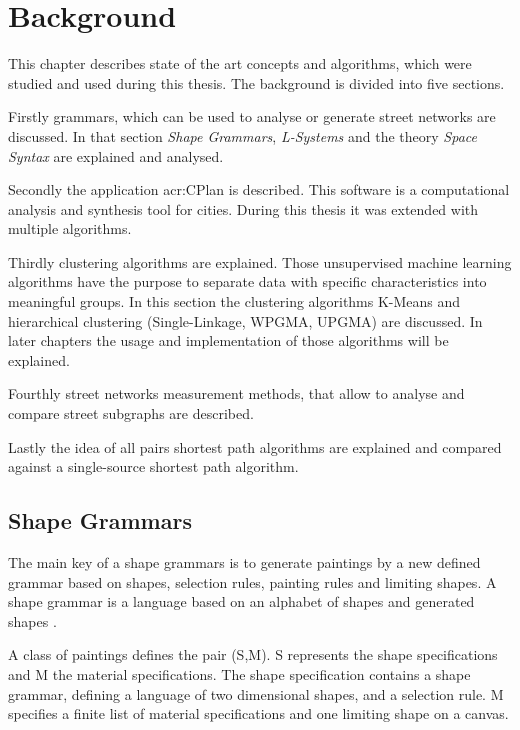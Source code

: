\chapter{Background}
This chapter describes state of the art concepts and algorithms, which were studied and used during this thesis. The background is divided into five sections.

Firstly grammars, which can be used to analyse or generate street networks are discussed. In that section \textit{Shape Grammars}, \textit{L-Systems} and the theory \textit{Space Syntax} are explained and analysed.

Secondly the application \gls{acr:CPlan} is described. This software is a computational analysis and synthesis tool for cities. During this thesis it was extended with multiple algorithms.

Thirdly clustering algorithms are explained. Those unsupervised machine learning algorithms have the purpose to separate data with specific characteristics into meaningful groups. In this section the clustering algorithms K-Means and hierarchical clustering (Single-Linkage, WPGMA, UPGMA) are discussed. In later chapters the usage and implementation of those algorithms will be explained.

Fourthly street networks measurement methods, that allow to analyse and compare street subgraphs are described.

Lastly the idea of all pairs shortest path algorithms are explained and compared against a single-source shortest path algorithm.

\section{Shape Grammars} \label{sec:shape_grammar}
The main key of a shape grammars is to generate paintings by a new defined grammar based on shapes, selection rules, painting rules and limiting shapes. A shape grammar is a language based on an alphabet of shapes and generated shapes \citep{shapeGrammars:1972}.

A class of paintings defines the pair (S,M). S represents the shape specifications and M the material specifications. The shape specification contains a shape grammar, defining a language of two dimensional shapes, and a selection rule. M specifies a finite list of material specifications and one limiting shape on a canvas.

